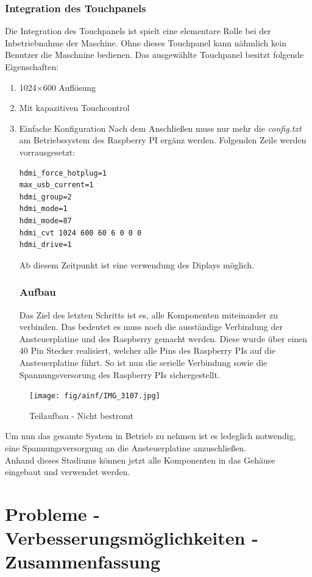\subsubsection{Integration des Touchpanels}
Die Integration des Touchpanels ist spielt eine elementare Rolle bei der Inbetriebnahme der Maschine.
Ohne dieses Touchpanel kann nähmlich kein Benutzer die Maschnine bedienen.
Das ausgewählte Touchpanel besitzt folgende Eigenschaften:
\begin{enumerate}
\item  1024×600 Auflösung
\item Mit kapazitiven Touchcontrol
\item Einfache Konfiguration
Nach dem Anschließen muss nur mehr die \textit{config.txt} am Betriebssystem des Raspberry PI ergänz werden.
Folgenden Zeile werden vorrausgesetzt:
\begin{lstlisting}[style=java,caption=Java-Codebeispiel,label=resource]
hdmi_force_hotplug=1
max_usb_current=1
hdmi_group=2
hdmi_mode=1
hdmi_mode=87
hdmi_cvt 1024 600 60 6 0 0 0
hdmi_drive=1
\end{lstlisting}
Ab diesem Zeitpunkt ist eine verwendung des Diplays möglich.
\subsubsection{Aufbau}
Das Ziel des letzten Schritts ist es, alle Komponenten miteinander zu verbinden.
Das bedeutet es muss noch die ausständige Verbindung der Ansteuerplatine und des Raspberry gemacht werden.
Diese wurde über einen 40 Pin Stecker realisiert, welcher alle Pins des Raspberry PIs auf die Ansteuerplatine führt.
So ist nun die serielle Verbindung sowie die Spannungsversorung des Raspberry PIs sichergestellt.
\end{enumerate}
\begin{figure}[H]
\centering
\texttt{[image: fig/ainf/IMG\_3107.jpg]}
\caption{Teilaufbau - Nicht bestromt}
\label{rpiAndDisplay}
\end{figure}
Um nun das gesamte System in Betrieb zu nehmen ist es ledeglich notwendig, eine Spannungsversorgung an die Ansteuerplatine anzuschließen.\\
Anhand dieses Stadiums können jetzt alle Komponenten in das Gehäuse eingebaut und verwendet werden.
\section{Probleme - Verbesserungsmöglichkeiten - Zusammenfassung}
